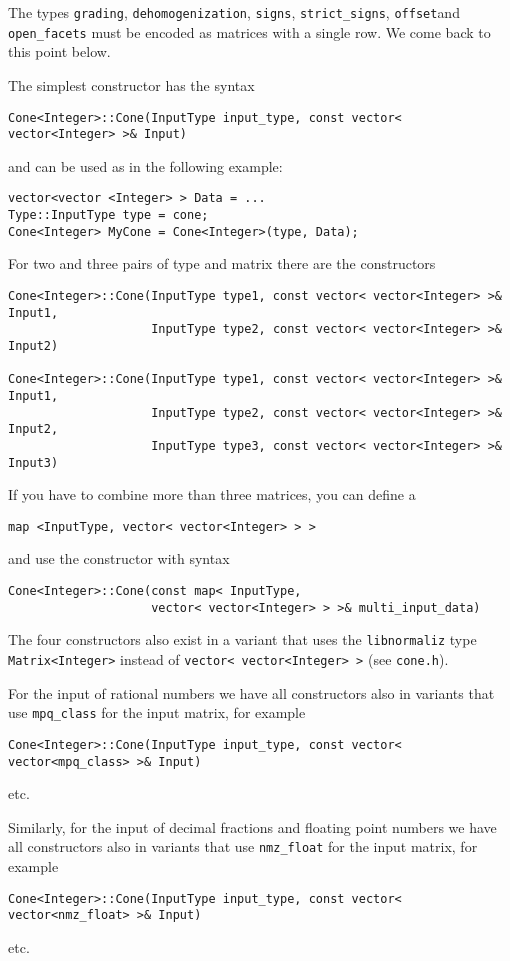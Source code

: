 \documentclass[12pt,a4paper]{scrartcl}
\theoremstyle{definition}
\begin{document}
\begin{small}
The types \verb|grading|, \verb|dehomogenization|, \verb|signs|, \verb|strict_signs|, \verb|offset|and \verb|open_facets| must be encoded as matrices with a single row. We come back to this point below.

The simplest constructor has the syntax
\begin{Verbatim}
Cone<Integer>::Cone(InputType input_type, const vector< vector<Integer> >& Input)
\end{Verbatim}
and can be used as in the following example:
\begin{Verbatim}
vector<vector <Integer> > Data = ...
Type::InputType type = cone;
Cone<Integer> MyCone = Cone<Integer>(type, Data);
\end{Verbatim}
For two and three pairs of type and matrix there are the constructors
\begin{Verbatim}
Cone<Integer>::Cone(InputType type1, const vector< vector<Integer> >& Input1,
                    InputType type2, const vector< vector<Integer> >& Input2)
                    
Cone<Integer>::Cone(InputType type1, const vector< vector<Integer> >& Input1,
                    InputType type2, const vector< vector<Integer> >& Input2,
                    InputType type3, const vector< vector<Integer> >& Input3)
\end{Verbatim}

If you have to combine more than three matrices, you can define a
\begin{Verbatim}
map <InputType, vector< vector<Integer> > >
\end{Verbatim}
and use the constructor with syntax
\begin{Verbatim}
Cone<Integer>::Cone(const map< InputType, 
                    vector< vector<Integer> > >& multi_input_data)
\end{Verbatim}

The four constructors also exist in a variant that uses the \verb|libnormaliz| type \verb|Matrix<Integer>| instead of \verb|vector< vector<Integer> >| (see \verb|cone.h|).

For the input of rational numbers we have all constructors also in variants that use \verb|mpq_class| for the input matrix, for example
\begin{Verbatim}
Cone<Integer>::Cone(InputType input_type, const vector< vector<mpq_class> >& Input)
\end{Verbatim}
etc.

Similarly, for the input of decimal fractions and floating point numbers we have all constructors also in variants that use \verb|nmz_float| for the input matrix, for example
\begin{Verbatim}
Cone<Integer>::Cone(InputType input_type, const vector< vector<nmz_float> >& Input)
\end{Verbatim}
etc.


\end{small}
\end{document}
